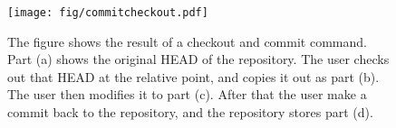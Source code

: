 \begin{figure}[t]
\centerline{\texttt{[image: fig/commitcheckout.pdf]}}
\caption{The figure shows the result of a checkout and commit command.
Part (a) shows the original HEAD of the repository. The user checks out that
HEAD at the relative point, and copies it out as part (b). The user then
modifies it to part (c). After that the user make a commit back to the
repository, and the repository stores part (d). 
}

\label{f:checkout-commit}
\end{figure}

\endinput


